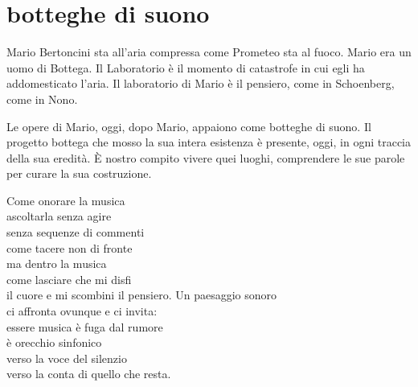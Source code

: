 %
%
%
%
%
%

\section*{botteghe di suono}


Mario Bertoncini sta all'aria compressa come Prometeo sta al fuoco. Mario era un
uomo di Bottega. Il Laboratorio è il momento di catastrofe in cui egli ha
addomesticato l'aria. Il laboratorio di Mario è il pensiero, come in Schoenberg,
come in Nono.

Le opere di Mario, oggi, dopo Mario, appaiono come botteghe di suono. Il
progetto bottega che mosso la sua intera esistenza è presente, oggi, in ogni
traccia della sua eredità. È nostro compito vivere quei luoghi, comprendere le
sue parole per curare la sua costruzione.


Come onorare la musica\\
ascoltarla senza agire\\
senza sequenze di commenti\\
come tacere non di fronte\\
ma dentro la musica\\
come lasciare che mi disfi\\
il cuore e mi scombini il pensiero.
Un paesaggio sonoro\\
ci affronta ovunque e ci invita:\\
essere musica è fuga dal rumore\\
è orecchio sinfonico\\
verso la voce del silenzio\\
verso la conta di quello che resta.
